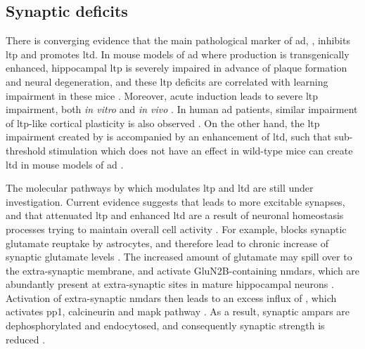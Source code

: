 \subsection{Synaptic deficits \label{ad.synaptic}}

There is converging evidence that the main pathological marker of \gls{ad}, \abeta{}, inhibits \gls{ltp} and promotes \gls{ltd}. In mouse models of \gls{ad} where \abeta{} production is transgenically enhanced, hippocampal \gls{ltp} is severely impaired in advance of plaque formation and neural degeneration, and these \gls{ltp} deficits are correlated with learning impairment in these mice \citep{hsia99, chapman99, roberson11}. Moreover, acute \abeta{} induction leads to severe \gls{ltp} impairment, both \textit{in vitro} \citep{lambert98, shankar08} and \textit{in vivo} \citep{walsh02, hu08}. In human \gls{ad} patients, similar impairment of \gls{ltp}-like cortical plasticity is also observed \citep{inghilleri06, koch12}. On the other hand, the \gls{ltp} impairment created by \abeta{} is accompanied by an enhancement of \gls{ltd}, such that sub-threshold stimulation which does not have an effect in wild-type mice can create \gls{ltd} in mouse models of \gls{ad} \citep{hsia99, fitzjohn01, jacobsen06}. 

The molecular pathways by which \abeta{} modulates \gls{ltp} and \gls{ltd} are still under investigation. Current evidence suggests that \abeta{} leads to more excitable synapses, and that attenuated \gls{ltp} and enhanced \gls{ltd} are a result of neuronal homeostasis processes trying to maintain overall cell activity \citep{guntupalli16, jang16}. For example, \abeta{} blocks synaptic glutamate reuptake by astrocytes, and therefore lead to chronic increase of synaptic glutamate levels \citep{matos08, li09}. The increased amount of glutamate may spill over to the extra-synaptic membrane, and activate GluN2B-containing \glspl{nmdar}, which are abundantly present at extra-synaptic sites in mature hippocampal neurons \citep{citri08, li11, shipton14}. Activation of extra-synaptic \glspl{nmdar} then leads to an excess influx of , which activates \gls{pp1}, calcineurin and \gls{mapk} pathway \citep{hsieh06, shankar07, zhao10}. As a result, synaptic \glspl{ampar} are dephosphorylated and endocytosed, and consequently synaptic strength is reduced \citep{hsieh06, liu10, minanomolina11}. 

